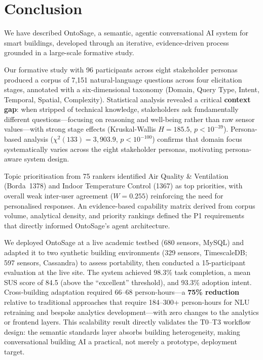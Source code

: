 \documentclass[acmsmall]{acmart}
\begin{document}
\section{Conclusion}
\label{sec:conclusion}

We have described OntoSage, a semantic, agentic conversational AI system for smart buildings, developed through an iterative, evidence-driven process grounded in a large-scale formative study.

Our formative study with 96 participants across eight stakeholder personas produced a corpus of 7{,}151 natural-language questions across four elicitation stages, annotated with a six-dimensional taxonomy (Domain, Query Type, Intent, Temporal, Spatial, Complexity). Statistical analysis revealed a critical \textbf{context gap}: when stripped of technical knowledge, stakeholders ask fundamentally different questions---focusing on reasoning and well-being rather than raw sensor values---with strong stage effects (Kruskal-Wallis $H=185.5$, $p < 10^{-39}$). Persona-based analysis ($\chi^2(133)=3{,}903.9$, $p < 10^{-100}$) confirms that domain focus systematically varies across the eight stakeholder personas, motivating persona-aware system design.

Topic prioritisation from 75 rankers identified Air Quality \& Ventilation (Borda~1378) and Indoor Temperature Control (1367) as top priorities, with overall weak inter-user agreement ($W=0.255$) reinforcing the need for personalised responses. An evidence-based capability matrix derived from corpus volume, analytical density, and priority rankings defined the P1 requirements that directly informed OntoSage's agent architecture.

We deployed OntoSage at a live academic testbed (680 sensors, MySQL) and adapted it to two synthetic building environments (329 sensors, TimescaleDB; 597 sensors, Cassandra) to assess portability, then conducted a 15-participant evaluation at the live site. The system achieved 98.3\% task completion, a mean SUS score of 84.5 (above the ``excellent'' threshold), and 93.3\% adoption intent. Cross-building adaptation required 66--68 person-hours---a \textbf{75\% reduction} relative to traditional approaches that require 184--300+ person-hours for NLU retraining and bespoke analytics development---with zero changes to the analytics or frontend layers. This scalability result directly validates the T0--T3 workflow design: the semantic standards layer absorbs building heterogeneity, making conversational building AI a practical, not merely a prototype, deployment target.
\end{document}
